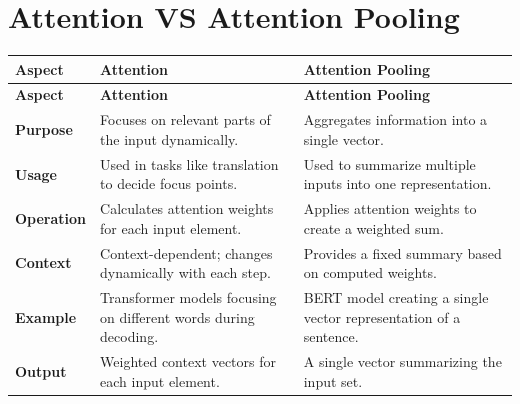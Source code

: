 
\section{Attention VS Attention Pooling \cite{chatgpt}} \label{Attention VS Attention Pooling}

\begin{customTableWrapper}{1.5}
\begin{longtable}{|p{2cm}|p{5cm}|p{5cm}|}
    \hline
    \textbf{Aspect} & \textbf{Attention} & \textbf{Attention Pooling} \\
    \hline
    \endfirsthead
    
    \hline
    \textbf{Aspect} & \textbf{Attention} & \textbf{Attention Pooling} \\
    \hline
    \endhead
    
    \hline
    \endfoot
    
    \hline
    \endlastfoot

    \textbf{Purpose} & Focuses on relevant parts of the input dynamically. & Aggregates information into a single vector. \\
    \hline
    
    \textbf{Usage} & Used in tasks like translation to decide focus points. & Used to summarize multiple inputs into one representation. \\
    \hline
    
    \textbf{Operation} & Calculates attention weights for each input element. & Applies attention weights to create a weighted sum. \\
    \hline
    
    \textbf{Context} & Context-dependent; changes dynamically with each step. & Provides a fixed summary based on computed weights. \\
    \hline
    
    \textbf{Example} & Transformer models focusing on different words during decoding. & BERT model creating a single vector representation of a sentence. \\
    \hline

    \textbf{Output} & Weighted context vectors for each input element. & A single vector summarizing the input set. \\
    \hline

\end{longtable}
\end{customTableWrapper}



